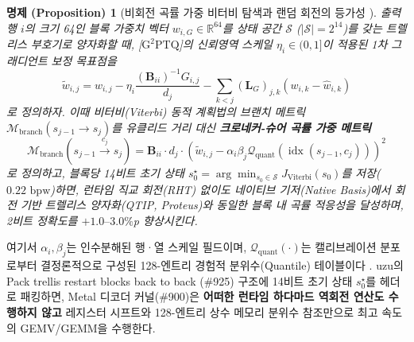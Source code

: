 \documentclass[10pt,a4paper]{article}
\newtheorem{proposition}[theorem]{명제 (Proposition)}
\begin{document}
\begin{proposition}[비회전 곡률 가중 비터비 탐색과 랜덤 회전의 등가성 \cite{ding2026curvetq,lee2026schurquant,liu2026g2ptq}]
출력 행 $i$의 크기 64인 블록 가중치 벡터 $w_{i,G} \in \mathbb{R}^{64}$를 상태 공간 $\mathcal{S}$ ($|\mathcal{S}| = 2^{14}$)를 갖는 트렐리스 부호기로 양자화할 때, [$\text{G}^2\text{PTQ}$]의 신뢰영역 스케일 $\eta_i \in (0, 1]$이 적용된 1차 그래디언트 보정 목표점을
\begin{equation}
\tilde{w}_{i,j} = w_{i,j} - \eta_i \frac{(\mathbf{B}_{ii})^{-1} G_{i,j}}{d_j} - \sum_{k < j} (\mathbf{L}_G)_{j,k} (w_{i,k} - \hat{w}_{i,k})
\end{equation}
로 정의하자. 이때 비터비(Viterbi) 동적 계획법의 브랜치 메트릭 $\mathcal{M}_{\text{branch}}(s_{j-1} \to s_j)$를 유클리드 거리 대신 \textbf{크로네커-슈어 곡률 가중 메트릭}
\begin{equation}
\mathcal{M}_{\text{branch}}\left(s_{j-1} \xrightarrow{c_j} s_j\right) = \mathbf{B}_{ii} \cdot d_j \cdot \left( \tilde{w}_{i,j} - \alpha_i \beta_j \mathcal{Q}_{\text{quant}}\!\left(\operatorname{idx}(s_{j-1}, c_j)\right) \right)^2
\label{eq:curvetq_metric}
\end{equation}
로 정의하고, 블록당 14비트 초기 상태 $s_0^\star = \arg\min_{s_0 \in \mathcal{S}} J_{\text{Viterbi}}(s_0)$를 저장($0.22\text{ bpw}$)하면, 런타임 직교 회전(RHT) 없이도 네이티브 기저(Native Basis)에서 회전 기반 트렐리스 양자화(QTIP, Proteus)와 동일한 블록 내 곡률 적응성을 달성하며, 2비트 정확도를 $+1.0\text{--}3.0\%$p 향상시킨다.
\end{proposition}
여기서 $\alpha_i, \beta_j$는 인수분해된 행·열 스케일 필드이며, $\mathcal{Q}_{\text{quant}}(\cdot)$는 캘리브레이션 분포로부터 결정론적으로 구성된 128-엔트리 경험적 분위수(Quantile) 테이블이다 \cite{ding2026curvetq}. \textsf{uzu}의 \textsf{Pack trellis restart blocks back to back} (\#925) 구조에 14비트 초기 상태 $s_0^\star$를 헤더로 패킹하면, Metal 디코더 커널(\#900)은 \textbf{어떠한 런타임 하다마드 역회전 연산도 수행하지 않고} 레지스터 시프트와 128-엔트리 상수 메모리 분위수 참조만으로 최고 속도의 GEMV/GEMM을 수행한다.
\end{document}
